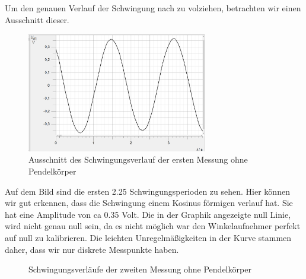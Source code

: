 \documentclass[twoside]{protokoll}
\begin{document}
Um den genauen Verlauf der Schwingung nach zu volziehen, betrachten wir einen Ausschnitt dieser. 
\begin{figure}[H]
    \centering
    \includegraphics[width=0.7\textwidth]{plots/stange-1-mehrere-schwingungeng.pdf}
    \caption{Ausschnitt des Schwingungsverlauf der ersten Messung ohne Pendelkörper}
\end{figure}

Auf dem Bild sind die ersten 2.25 Schwingungsperioden zu sehen.
Hier können wir gut erkennen, dass die Schwingung einem Kosinus förmigen verlauf hat.  
Sie hat eine Amplitude von ca 0.35 Volt. 
Die in der Graphik angezeigte null Linie, wird nicht genau null sein, da es nicht möglich war den Winkelaufnehmer perfekt auf null zu kalibrieren.
Die leichten Unregelmäßigkeiten in der Kurve stammen daher, dass wir nur diskrete Messpunkte haben. 

\begin{figure}[H]
    \centering
    \hfill
    \caption{Schwingungsverläufe der zweiten Messung ohne Pendelkörper}
\end{figure}
\end{document}
